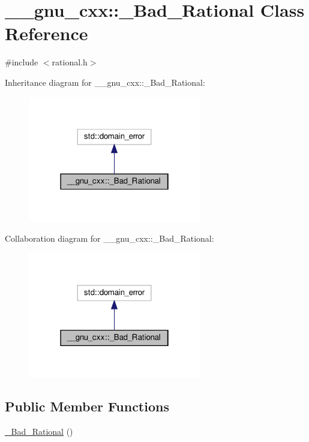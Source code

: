 \hypertarget{class____gnu__cxx_1_1__Bad__Rational}{}\section{\+\_\+\+\_\+gnu\+\_\+cxx\+:\+:\+\_\+\+Bad\+\_\+\+Rational Class Reference}
\label{class____gnu__cxx_1_1__Bad__Rational}


{\ttfamily \#include $<$rational.\+h$>$}



Inheritance diagram for \+\_\+\+\_\+gnu\+\_\+cxx\+:\+:\+\_\+\+Bad\+\_\+\+Rational\+:\nopagebreak
\begin{figure}[H]
\begin{center}
\leavevmode
\includegraphics[width=214pt]{class____gnu__cxx_1_1__Bad__Rational__inherit__graph}
\end{center}
\end{figure}


Collaboration diagram for \+\_\+\+\_\+gnu\+\_\+cxx\+:\+:\+\_\+\+Bad\+\_\+\+Rational\+:\nopagebreak
\begin{figure}[H]
\begin{center}
\leavevmode
\includegraphics[width=214pt]{class____gnu__cxx_1_1__Bad__Rational__coll__graph}
\end{center}
\end{figure}
\subsection*{Public Member Functions}
\begin{DoxyCompactItemize}
\item 
\hyperlink{class____gnu__cxx_1_1__Bad__Rational_ac36ea67ca08d9ffe4c15e87d5fb7d410}{\+\_\+\+Bad\+\_\+\+Rational} ()
\end{DoxyCompactItemize}



